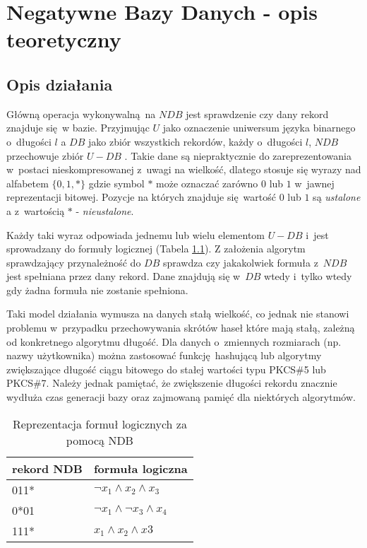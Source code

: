 \chapter{Negatywne Bazy Danych - opis teoretyczny}
\section{Opis działania}
Główną operacja wykonywalną na $NDB$ jest sprawdzenie czy dany rekord znajduje się w bazie. Przyjmując $U$ 
jako oznaczenie uniwersum języka binarnego o~długości $l$ a $DB$ jako zbiór wszystkich rekordów, każdy o~długości $l$,
$NDB$ przechowuje zbiór $U - DB$ \cite{NRI-Esponda}. Takie dane są niepraktycznie do zareprezentowania w~postaci nieskompresowanej z~uwagi na wielkość, dlatego
stosuje się wyrazy nad alfabetem $\{0,1,*\}$ gdzie symbol $*$ może oznaczać zarówno $0$ lub $1$ w~jawnej reprezentacji bitowej.
Pozycje na których znajduje się wartość $0$ lub $1$ są \textit{ustalone} a z~wartością $*$ - \textit{nieustalone}.

Każdy taki wyraz odpowiada jednemu lub wielu elementom $U - DB$ i~jest sprowadzany do formuły logicznej (Tabela \ref{Tbl:NDB-logform}).
Z założenia algorytm sprawdzający przynależność do $DB$ sprawdza czy jakakolwiek formuła z~$NDB$ jest spełniana przez dany rekord. 
Dane znajdują się w~$DB$ wtedy i~tylko wtedy gdy żadna formuła nie zostanie spełniona. 

Taki model działania wymusza na danych stałą wielkość,
co jednak nie stanowi problemu w~przypadku przechowywania skrótów haseł które mają stałą, zależną od konkretnego algorytmu długość.
Dla danych o~zmiennych rozmiarach (np. nazwy użytkownika) można zastosować funkcję hashującą lub algorytmy zwiększające długość ciągu bitowego do stałej wartości typu PKCS\#5 lub PKCS\#7.
Należy jednak pamiętać, że zwiększenie długości rekordu znacznie wydłuża czas generacji bazy oraz zajmowaną pamięć dla niektórych algorytmów. 

\begin{table}[h]
    \caption{Reprezentacja formuł logicznych za pomocą NDB}
    \centering
    \label{Tbl:NDB-logform}
    \begin{tabular}{|l|l|}
        \hline
        rekord NDB & formuła logiczna                       \\ \hline
        011*       & $\neg{x_1} \land x_2 \land x_3$        \\ \hline
        0*01       & $\neg{x_1} \land \neg{x_3} \land x_4 $ \\ \hline
        111*       & $x_1 \land x_2 \land x3$               \\ \hline
    \end{tabular}
\end{table}

